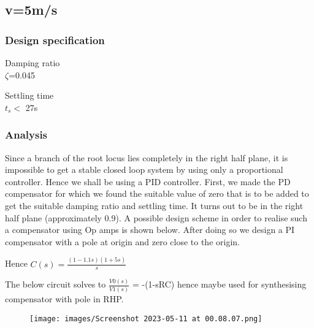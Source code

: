 \documentclass[notitlepage]{article}
\begin{document}
\subsection{v=5m/s}

\subsubsection{Design specification}
\begin{center}
Damping ratio\\
$\zeta$=0.045
\end{center}

\begin{center}
Settling time\\
\small $t_s  <$ 27s
\end{center}



\subsubsection{Analysis}
\small Since a branch of the root locus lies completely in the right half plane, it is impossible to get a stable closed loop system by using only a proportional controller.
Hence we shall be using a PID controller. First, we made the PD compensator for which we found the suitable value of zero that is to be added to get the suitable damping ratio and settling time. It turns out to be in the right half plane (approximately 0.9). A possible design scheme in order to realise such a compensator using Op amps is shown below. After doing so we design a PI compensator with a pole at origin and zero close to the origin.


\vspace{3mm}

\noindent Hence $C(s) = \frac{{(1-1.1s)}{(1+5s)}}{s} $

\small \noindent The below circuit solves to $\frac{V0(s)}{V1(s)}$ = -(1-sRC) hence maybe used for synthesising compensator with pole in RHP.
\begin{figure}[h!]
    \centering
    \texttt{[image: images/Screenshot 2023-05-11 at 00.08.07.png]}
     \label{fig:my_label}
 \end{figure}
\end{document}
